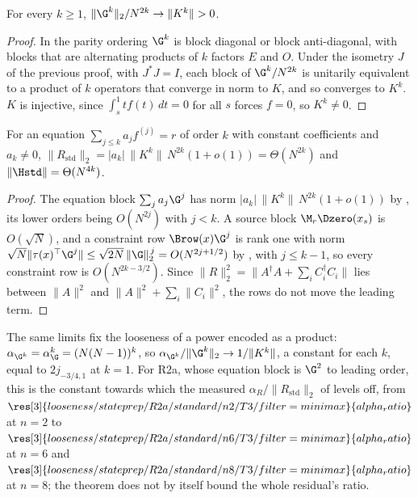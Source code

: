 \begin{theorem}
\label{thm:Gk-limit}
For every $k\ge1$, $\|\G^k\|_2/N^{2k}\to\|K^k\|>0$.
\end{theorem}
\begin{proof}
In the parity ordering $\G^k$ is block diagonal or block anti-diagonal, with blocks that are alternating products of $k$ factors $E$ and $O$. Under the isometry $J$ of the previous proof, with $J^*J=I$, each block of $\G^k/N^{2k}$ is unitarily equivalent to a product of $k$ operators that converge in norm to $K$, and so converges to $K^k$. $K$ is injective, since $\int_s^1tf(t)\,dt=0$ for all $s$ forces $f=0$, so $K^k\ne0$.
\end{proof}

\begin{corollary}
\label{cor:std-norm}
For an equation $\sum_{j\le k}a_jf^{(j)}=r$ of order $k$ with constant coefficients and $a_k\ne0$, $\|R_{\mathrm{std}}\|_2=|a_k|\,\|K^k\|\,N^{2k}(1+o(1))=\Theta(N^{2k})$ and $\|\Hstd\|=\Theta(N^{4k})$.
\end{corollary}
\begin{proof}
The equation block $\sum_ja_j\G^j$ has norm $|a_k|\,\|K^k\|\,N^{2k}(1+o(1))$ by , its lower orders being $O(N^{2j})$ with $j<k$. A source block $\M_r\Dzero(x_s)$ is $O(\sqrt N)$, and a constraint row $\Brow(x)\G^j$ is rank one with norm $\sqrt N\|\tau(x)^{\top}\G^j\|\le\sqrt{2N}\,\|\G\|_2^{\,j}=O(N^{2j+1/2})$ by , with $j\le k-1$, so every constraint row is $O(N^{2k-3/2})$. Since $\|R\|_2^2=\|A^\dagger A+\sum_iC_i^\dagger C_i\|$ lies between $\|A\|^2$ and $\|A\|^2+\sum_i\|C_i\|^2$, the rows do not move the leading term.
\end{proof}

The same limits fix the looseness of a power encoded as a product: $\alpha_{\G^k}=\alpha_\G^k=(N(N-1))^k$, so $\alpha_{\G^k}/\|\G^k\|_2\to1/\|K^k\|$, a constant for each $k$, equal to $2j_{-3/4,1}$ at $k=1$. For R2a, whose equation block is $\G^2$ to leading order, this is the constant towards which the measured $\alpha_R/\|R_{\mathrm{std}}\|_2$ of  levels off, from $\res[3]{looseness/stateprep/R2a/standard/n2/T3/filter=minimax}{alpha_ratio}$ at $n=2$ to $\res[3]{looseness/stateprep/R2a/standard/n6/T3/filter=minimax}{alpha_ratio}$ at $n=6$ and $\res[3]{looseness/stateprep/R2a/standard/n8/T3/filter=minimax}{alpha_ratio}$ at $n=8$; the theorem does not by itself bound the whole residual's ratio.

